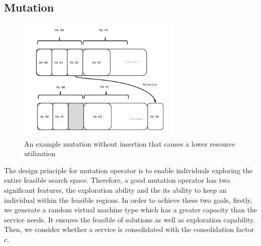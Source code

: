 \subsection{Mutation}
\begin{figure}
\centering
  \includegraphics[width=0.7\textwidth]{pics/preliminary/hollow.png}
  \caption{An example mutation without insertion that causes a lower resource utilization}
  \label{fig:hollow}
\end{figure}

The design principle for mutation operator is to enable individuals exploring the entire feasible search space.
Therefore, a good mutation operator has two significant features, the exploration ability and the its ability to keep an individual within the feasible regions. In order to achieve these two goals, firstly, we generate a random virtual machine type which has a greater capacity than the service needs. It ensures the feasible of solutions as well as exploration capability. Then, we consider whether a service is consolidated with the consolidation factor $c$. 

